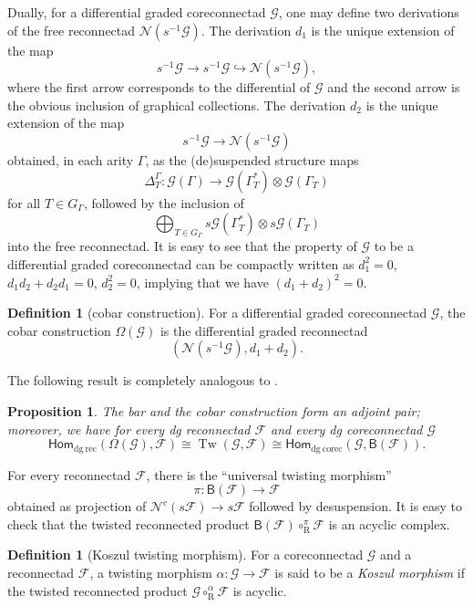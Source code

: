 \documentclass[11pt]{article}
\newtheorem{prop}[theo]{Proposition}
\theoremstyle{definition}
\newtheorem{defi}[theo]{Definition}
\numberwithin{equation}{section}
\newcommand\calF{\mathcal{F}}
\newcommand\calG{\mathcal{G}}
\newcommand\calN{\mathcal{N}}
\DeclareMathOperator{\rmR}{\mathrm{R}}
\DeclareMathOperator{\Tw}{Tw}
\begin{document}
Dually, for a differential graded coreconnectad $\calG$, one may define two derivations of the free reconnectad $\calN(s^{-1}\calG)$. The derivation $d_1$ is the unique extension of the map
 \[
s^{-1}\calG\to s^{-1}\calG\hookrightarrow\calN(s^{-1}\calG),
 \]
where the first arrow corresponds to the differential of $\calG$ and the second arrow is the obvious inclusion of graphical collections. The derivation $d_2$ is the unique extension of the map
 \[
s^{-1}\calG\to \calN(s^{-1}\calG) 
 \]
obtained, in each arity $\Gamma$, as the (de)suspended structure maps 
 \[
\Delta_T^\Gamma\colon  \calG(\Gamma)\to \calG(\Gamma^*_T)\otimes \calG(\Gamma_T)
 \]
for all $T\in G_\Gamma$, followed by the inclusion of
 \[
\bigoplus_{T\in G_\Gamma}s\calG(\Gamma^*_T)\otimes s\calG(\Gamma_T)
 \]
into the free reconnectad. It is easy to see that the property of $\calG$ to be a differential graded coreconnectad can be compactly written as $d_1^2=0$, $d_1d_2+d_2d_1=0$, $d_2^2=0$, implying that we have $(d_1+d_2)^2=0$.

\begin{defi}[cobar construction]
For a differential graded coreconnectad $\calG$, the cobar construction $\Omega(\calG)$ is the differential graded reconnectad 
 \[
(\calN(s^{-1}\calG),d_1+d_2).
 \]
\end{defi}

The following result is completely analogous to \cite[Th.~6.5.10]{MR2954392}.

\begin{prop}
The bar and the cobar construction form an adjoint pair; moreover, we have for every dg reconnectad $\calF$ and every dg coreconnectad $\calG$
 \[
\mathsf{Hom}_{\mathrm{dg\ rec}}(\Omega(\calG), \calF)\cong\Tw(\calG,\calF) \cong \mathsf{Hom}_{\mathrm{dg\ corec}}(\calG, \mathsf{B}(\calF)).
 \]
\end{prop} 

For every reconnectad $\calF$, there is the ``universal twisting morphism'' $$\pi\colon\mathsf{B}(\calF)\to\calF$$ obtained as projection of $\calN^c(s\calF)\to s\calF $ followed by desuspension. It is easy to check that the twisted reconnected product $\mathsf{B}(\calF)\circ^\pi_{\rmR}\calF$ is an acyclic complex.

\begin{defi}[Koszul twisting morphism]
For a coreconnectad $\calG$ and a reconnectad $\calF$, a twisting morphism $\alpha\colon\calG\to\calF$ is said to be a \emph{Koszul morphism} if the twisted reconnected product $\calG\circ^\alpha_{\rmR}\calF$ is acyclic. 
\end{defi}
\end{document}
